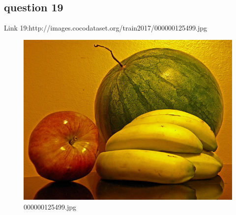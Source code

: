 \subsection*{question 19}
Link 19:http://images.cocodataset.org/train2017/000000125499.jpg
    \begin{figure}[h]
        \centering
        \includegraphics[width=0.8\linewidth]{../image set/easy/000000125499.jpg}
        \caption{000000125499.jpg}
    \end{figure}
